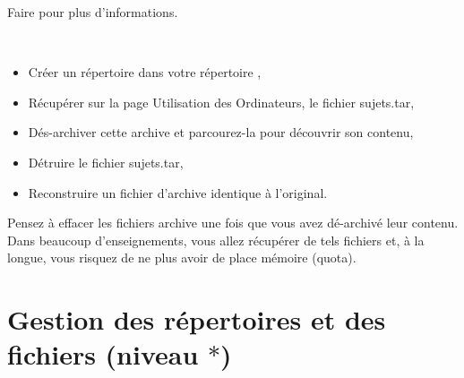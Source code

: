 \documentclass[a4paper,11pt]{article}
\begin{document}
Faire  pour plus d'informations.

\

\begin{maw}

\begin{itemize}
  \item Créer un répertoire  dans votre répertoire
        ,
  \item Récupérer sur la page Utilisation des Ordinateurs,
        le fichier sujets.tar,
  \item Dés-archiver cette archive et parcourez-la pour découvrir son
        contenu,
  \item Détruire le fichier sujets.tar,
  \item Reconstruire un fichier d'archive identique à l'original.
\end{itemize}
\end{maw}


\begin{danger}[Conseil]
Pensez à effacer les fichiers archive une fois que vous avez dé-archivé leur
contenu. Dans beaucoup d'enseignements, vous allez récupérer de tels fichiers
et, à la longue, vous risquez de ne plus avoir de place mémoire (quota).
\end{danger}

\section{Gestion des répertoires et des fichiers (niveau $*$)}
\end{document}
